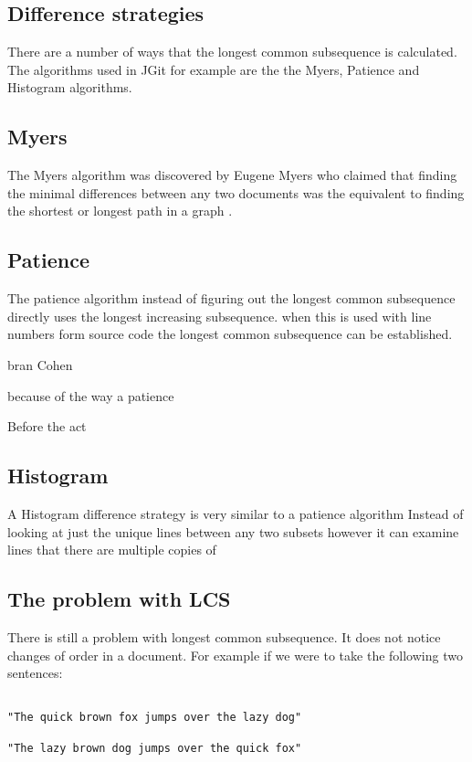 \subsection{Difference strategies}
There are a number of ways that the longest common subsequence is calculated. The algorithms used in JGit for example are the the Myers, Patience and Histogram algorithms.

\subsection{Myers}
The Myers algorithm was discovered by Eugene Myers who claimed that finding the minimal differences between any two documents was the equivalent to finding the shortest or longest path in a graph \cite{Myers1986}.

\subsection{Patience}
The patience algorithm instead of figuring out the longest common subsequence directly uses the longest increasing subsequence.
when this is used with line numbers form source code the longest common subsequence can be established.

bran Cohen

because of the way a patience 

Before the act

\subsection{Histogram}
A Histogram difference strategy is very similar to a patience algorithm
Instead of looking at just the unique lines between any two subsets however it can examine lines that there are multiple copies of 

\subsection{The problem with LCS}
There is still a problem with longest common subsequence. It does not notice changes of order in a document.  For example if we were to take the following two sentences:


\begin{verbatim}

"The quick brown fox jumps over the lazy dog"

"The lazy brown dog jumps over the quick fox"

\end{verbatim}

